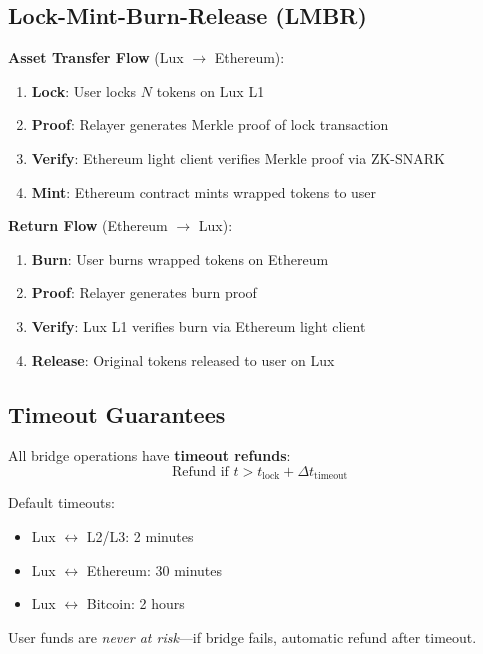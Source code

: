 \documentclass[11pt]{article}
\begin{document}
\subsection{Lock-Mint-Burn-Release (LMBR)}

\textbf{Asset Transfer Flow} (Lux $\to$ Ethereum):

\begin{enumerate}
  \item \textbf{Lock}: User locks $N$ tokens on Lux L1
  \item \textbf{Proof}: Relayer generates Merkle proof of lock transaction
  \item \textbf{Verify}: Ethereum light client verifies Merkle proof via ZK-SNARK
  \item \textbf{Mint}: Ethereum contract mints wrapped tokens to user
\end{enumerate}

\textbf{Return Flow} (Ethereum $\to$ Lux):
\begin{enumerate}
  \item \textbf{Burn}: User burns wrapped tokens on Ethereum
  \item \textbf{Proof}: Relayer generates burn proof
  \item \textbf{Verify}: Lux L1 verifies burn via Ethereum light client
  \item \textbf{Release}: Original tokens released to user on Lux
\end{enumerate}

\subsection{Timeout Guarantees}

All bridge operations have \textbf{timeout refunds}:
\begin{equation}
\text{Refund if } t > t_{\text{lock}} + \Delta t_{\text{timeout}}
\end{equation}

Default timeouts:
\begin{itemize}[leftmargin=1.1em]
  \item Lux $\leftrightarrow$ L2/L3: 2 minutes
  \item Lux $\leftrightarrow$ Ethereum: 30 minutes
  \item Lux $\leftrightarrow$ Bitcoin: 2 hours
\end{itemize}

User funds are \emph{never at risk}---if bridge fails, automatic refund after timeout.
\end{document}

